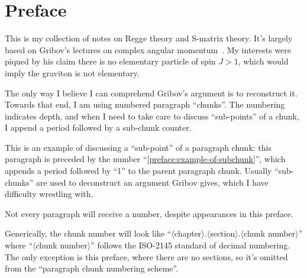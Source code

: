 \renewcommand\paragraphprefix{\thechapter.}

\chapter*{Preface}

\M
This is my collection of notes on Regge theory and S-matrix theory.
It's largely based on Gribov's lectures on complex angular momentum~\cite{Gribov:2003nw}.
My interests were piqued by his claim there is no elementary particle of
spin $J>1$, which would imply the graviton is not elementary.

The only way I believe I can comprehend Gribov's argument is to
reconstruct it. Towards that end, I am using numbered paragraph
``chunks''. The numbering indicates depth, and when I need to take care
to discuss ``sub-points'' of a chunk, I append a period followed by a
sub-chunk counter.

\M[1]\label{preface:example-of-subchunk}
This is an example of discussing a ``sub-point'' of a paragraph
chunk: this paragraph is preceded by the number
``\ref{preface:example-of-subchunk}'', which appends a period followed
by ``1'' to the parent paragraph chunk.
Usually ``sub-chunks'' are used to deconstruct an argument Gribov gives, which
I have difficulty wrestling with.

\M
Not every paragraph will receive a number, despite appearances in this
preface.

 Generically, the chunk number will look like
``$\langle$chapter$\rangle$.$\langle$section$\rangle$.$\langle$chunk number$\rangle$''
where ``$\langle$chunk number$\rangle$'' follows the ISO-2145 standard
of decimal numbering. The only exception is this preface, where there
are no sections, so it's omitted from the ``paragraph chunk numbering
scheme''.
